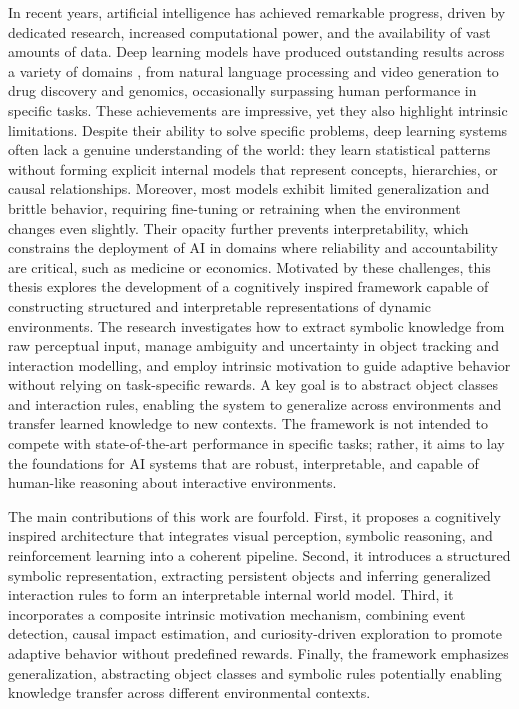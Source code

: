 \documentclass[12pt,a4paper]{report}
\begin{document}
In recent years, artificial intelligence has achieved remarkable progress, driven by dedicated research, increased computational power, and the availability of vast amounts of data. Deep learning models have produced outstanding results across a variety of domains \cite{chiave1}, from natural language processing and video generation to drug discovery and genomics, occasionally surpassing human performance in specific tasks. These achievements are impressive, yet they also highlight intrinsic limitations. Despite their ability to solve specific problems, deep learning systems often lack a genuine understanding of the world: they learn statistical patterns without forming explicit internal models that represent concepts, hierarchies, or causal relationships. Moreover, most models exhibit limited generalization and brittle behavior, requiring fine-tuning or retraining when the environment changes even slightly. Their opacity further prevents interpretability, which constrains the deployment of AI in domains where reliability and accountability are critical, such as medicine or economics.
Motivated by these challenges, this thesis explores the development of a cognitively inspired framework capable of constructing structured and interpretable representations of dynamic environments. The research investigates how to extract symbolic knowledge from raw perceptual input, manage ambiguity and uncertainty in object tracking and interaction modelling, and employ intrinsic motivation to guide adaptive behavior without relying on task-specific rewards. A key goal is to abstract object classes and interaction rules, enabling the system to generalize across environments and transfer learned knowledge to new contexts. The framework is not intended to compete with state-of-the-art performance in specific tasks; rather, it aims to lay the foundations for AI systems that are robust, interpretable, and capable of human-like reasoning about interactive environments.

The main contributions of this work are fourfold. First, it proposes a cognitively inspired architecture that integrates visual perception, symbolic reasoning, and reinforcement learning into a coherent pipeline. Second, it introduces a structured symbolic representation, extracting persistent objects and inferring generalized interaction rules to form an interpretable internal world model. Third, it incorporates a composite intrinsic motivation mechanism, combining event detection, causal impact estimation, and curiosity-driven exploration to promote adaptive behavior without predefined rewards. Finally, the framework emphasizes generalization, abstracting object classes and symbolic rules potentially enabling knowledge transfer across different environmental contexts.
\end{document}
